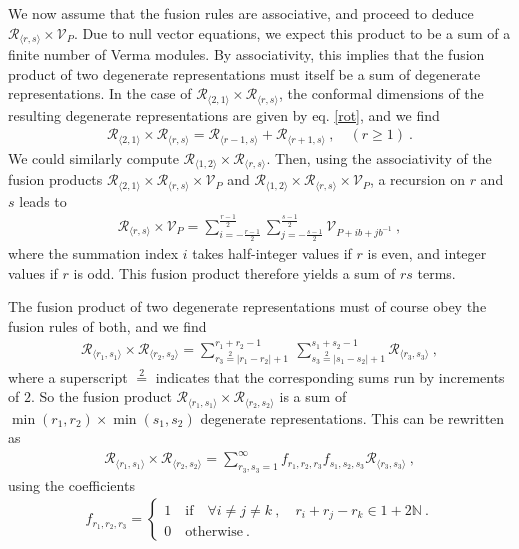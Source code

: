 \documentclass[12pt, a4paper, notitlepage, twoside]{report}
\numberwithin{equation}{section}
\theoremstyle{break}
\begin{document}
We now assume that the fusion rules are associative, and proceed to deduce $\mathcal{R}_{\langle r,s \rangle}\times \mathcal{V}_P$.
Due to null vector equations, we expect this product to be a sum of a finite number of Verma modules.
By associativity, this implies that the fusion product of two degenerate representations must itself be a sum of degenerate representations.
In the case of  
$\mathcal{R}_{\langle 2,1\rangle}\times \mathcal{R}_{\langle r,s\rangle}$, the conformal dimensions of the resulting degenerate representations are given by eq. \eqref{rot}, and we find
\begin{align}
\mathcal{R}_{\langle 2,1\rangle}\times \mathcal{R}_{\langle r,s\rangle} = \mathcal{R}_{\langle r-1,s\rangle} + \mathcal{R}_{\langle r+1,s\rangle }\ , \quad (r\geq 1)\ .
\label{rtod}
\end{align}
We could similarly compute $\mathcal{R}_{\langle 1,2\rangle}\times \mathcal{R}_{\langle r,s\rangle}$.
Then, using the associativity of the fusion products $\mathcal{R}_{\langle 2,1\rangle}\times \mathcal{R}_{\langle r,s\rangle}\times \mathcal{V}_P$ and $\mathcal{R}_{\langle 1,2\rangle}\times \mathcal{R}_{\langle r,s\rangle}\times \mathcal{V}_P$, a recursion on $r$ and $s$ leads to
\begin{align}
 \boxed{\mathcal{R}_{\langle r,s \rangle}\times \mathcal{V}_P = \sum_{i=-\frac{r-1}{2}}^{\frac{r-1}{2}} \sum_{j=-\frac{s-1}{2}}^{\frac{s-1}{2}} \mathcal{V}_{P + ib+jb^{-1}}}
 \ ,
\label{rtv}
\end{align}
where the summation index $i$ takes half-integer values if $r$ is even, and integer values if $r$ is odd. 
This fusion product therefore yields a sum of 
$rs$ terms.

The fusion product of two degenerate representations must of course obey the fusion rules of both, and we find
\begin{align}
 \boxed{\mathcal{R}_{\langle r_1,s_1 \rangle} \times \mathcal{R}_{\langle r_2,s_2 \rangle} = \sum_{r_3\overset{2}{=}|r_1-r_2|+1}^{r_1+r_2-1}\ \sum_{s_3\overset{2}{=}|s_1-s_2|+1}^{s_1+s_2-1} \mathcal{R}_{\langle r_3,s_3 \rangle}}\ ,
\label{rrsr}
\end{align}
where a superscript $\overset{2}{=}$ indicates that the corresponding sums run by increments of $2$.
So the fusion product $\mathcal{R}_{\langle r_1,s_1 \rangle} \times \mathcal{R}_{\langle r_2,s_2 \rangle}$ is a sum of $\min(r_1,r_2)\times \min(s_1,s_2)$ degenerate representations.
This can be rewritten as 
\begin{align}
\mathcal{R}_{\langle r_1,s_1 \rangle} \times \mathcal{R}_{\langle r_2,s_2 \rangle} = \sum_{r_3,s_3=1}^\infty f_{r_1,r_2,r_3} f_{s_1,s_2,s_3} \mathcal{R}_{\langle r_3,s_3 \rangle}\ ,
 \label{rrrsss}
\end{align}
using the coefficients
\begin{align}
f_{r_1,r_2,r_3} = \left\{\begin{array}{l}  1 \quad \text{if} \quad 
 \forall i\neq j\neq k \ , \quad r_i+r_j-r_k \in 1 + 2{\mathbb{N}}\ .
\\ 0 \quad \text{otherwise} \ .\end{array}\right.  
\label{frrr}
\end{align} 
\end{document}
